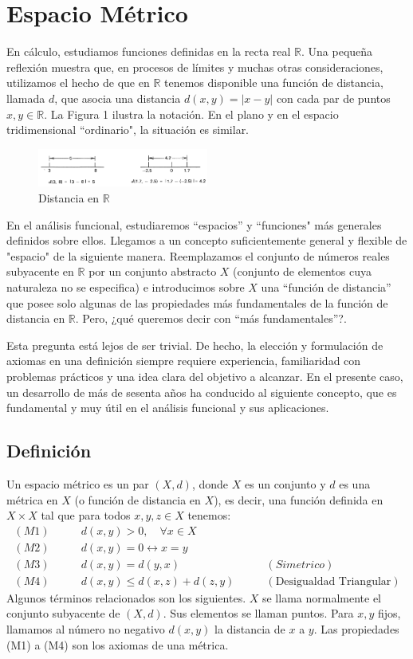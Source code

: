 \section{Espacio Métrico} 
{
En cálculo, estudiamos funciones definidas en la recta real $\mathbb{R}$. Una pequeña reflexión muestra que, en procesos de límites y muchas otras consideraciones, utilizamos el hecho de que en $\mathbb{R}$ tenemos disponible una función de distancia, llamada $d$, que asocia una distancia $d(x,y)=|x-y|$ con cada par de puntos
\(x, y \in \mathbb{R}\). La Figura 1 ilustra la notación. En el plano y en el espacio tridimensional ``ordinario", la situación es similar.
\begin{figure}[H]
    \centering
    \includegraphics[width=0.5\textwidth]{img/metricSpace/1.png}
    \caption{Distancia en $\mathbb{R}$}
\end{figure}
En el análisis funcional, estudiaremos ``espacios''  y  ``funciones" más generales definidos sobre ellos. Llegamos a un concepto suficientemente general y flexible de "espacio" de la siguiente manera. Reemplazamos el conjunto de números reales subyacente en \(\mathbb{R}\) por un conjunto abstracto \(X\) (conjunto de elementos cuya naturaleza no se especifica) e introducimos sobre \(X\) una ``función de distancia'' que posee solo algunas de las propiedades más fundamentales de la función de distancia en \(\mathbb{R}\). Pero, ¿qué queremos decir con ``más fundamentales''?. 

Esta pregunta está lejos de ser trivial. De hecho, la elección y formulación de axiomas en una definición siempre requiere experiencia, familiaridad con problemas prácticos y una idea clara del objetivo a alcanzar. En el presente caso, un desarrollo de más de sesenta años ha conducido al siguiente concepto, que es fundamental y muy útil en el análisis funcional y sus aplicaciones.

\subsection{Definición}
Un espacio métrico es un par \((X, d)\), donde \(X\) es un conjunto y \(d\) es una métrica en \(X\) (o función de distancia en \(X\)), es decir, una función definida en \(X \times X\) tal que para todos \(x, y, z \in X\) tenemos:
\begin{align*}
    (M1)&\quad\quad d(x,y)>0,\quad\forall x\in X\\
    (M2)&\quad\quad d(x,y)=0 \leftrightarrow x=y\\
    (M3)&\quad\quad d(x,y)=d(y,x)\quad\quad &(Simetrico)\\
    (M4)&\quad\quad d(x,y)\leq d(x,z)+d(z,y)\quad\quad &(\text{Desigualdad Triangular})
\end{align*}
Algunos términos relacionados son los siguientes. \(X\) se llama normalmente el conjunto subyacente de \((X, d)\). Sus elementos se llaman puntos. Para \(x, y\) fijos, llamamos al número no negativo \(d(x, y)\) la distancia de \(x\) a \(y\). Las propiedades (M1) a (M4) son los axiomas de una métrica. 

}
